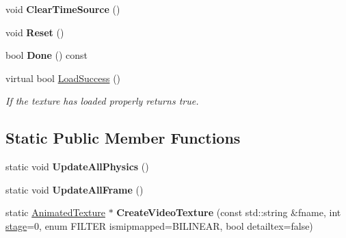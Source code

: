 \begin{DoxyCompactItemize}
\item 
void {\bfseries Clear\+Time\+Source} ()\hypertarget{classAnimatedTexture_a864400a47c00eecc5401a81bf9efb678}{}\label{classAnimatedTexture_a864400a47c00eecc5401a81bf9efb678}

\item 
void {\bfseries Reset} ()\hypertarget{classAnimatedTexture_a97b4a32b3eaad1200ff90bc349010004}{}\label{classAnimatedTexture_a97b4a32b3eaad1200ff90bc349010004}

\item 
bool {\bfseries Done} () const \hypertarget{classAnimatedTexture_a9e7f52346b339a6dc8af58ffa5d995fd}{}\label{classAnimatedTexture_a9e7f52346b339a6dc8af58ffa5d995fd}

\item 
virtual bool \hyperlink{classAnimatedTexture_aabb88a6db6ca3df2c1b7c46814cec39e}{Load\+Success} ()\hypertarget{classAnimatedTexture_aabb88a6db6ca3df2c1b7c46814cec39e}{}\label{classAnimatedTexture_aabb88a6db6ca3df2c1b7c46814cec39e}

\begin{DoxyCompactList}\small\item\em If the texture has loaded properly returns true. \end{DoxyCompactList}\end{DoxyCompactItemize}
\subsection*{Static Public Member Functions}
\begin{DoxyCompactItemize}
\item 
static void {\bfseries Update\+All\+Physics} ()\hypertarget{classAnimatedTexture_a6c94693cdb8e5b26ebfa0531689a7c38}{}\label{classAnimatedTexture_a6c94693cdb8e5b26ebfa0531689a7c38}

\item 
static void {\bfseries Update\+All\+Frame} ()\hypertarget{classAnimatedTexture_a14ec56b5c3cca0f6d66bcf79355edb2a}{}\label{classAnimatedTexture_a14ec56b5c3cca0f6d66bcf79355edb2a}

\item 
static \hyperlink{classAnimatedTexture}{Animated\+Texture} $\ast$ {\bfseries Create\+Video\+Texture} (const std\+::string \&fname, int \hyperlink{classTexture_aa38999434f9fcf409ca20b4523852b7b}{stage}=0, enum F\+I\+L\+T\+ER ismipmapped=B\+I\+L\+I\+N\+E\+AR, bool detailtex=false)\hypertarget{classAnimatedTexture_a4732c7e13b8a2bb78f656e5549ee4469}{}\label{classAnimatedTexture_a4732c7e13b8a2bb78f656e5549ee4469}

\end{DoxyCompactItemize}
